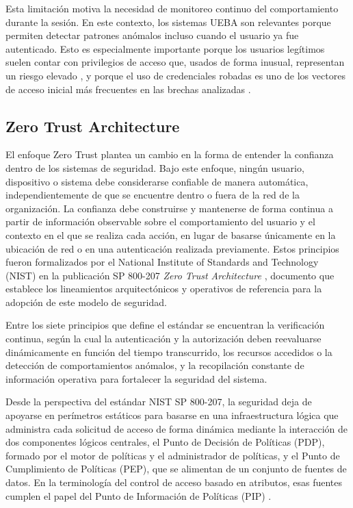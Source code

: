 Esta limitación motiva la necesidad de monitoreo continuo del comportamiento durante la sesión. En este contexto, los sistemas UEBA son relevantes porque permiten detectar patrones anómalos incluso cuando el usuario ya fue autenticado. Esto es especialmente importante porque los usuarios legítimos suelen contar con privilegios de acceso que, usados de forma inusual, representan un riesgo elevado \parencite{Artioli2024}, y porque el uso de credenciales robadas es uno de los vectores de acceso inicial más frecuentes en las brechas analizadas \parencite{Verizon2025}.

\subsection{Zero Trust Architecture}\label{sec:zero-trust}
El enfoque Zero Trust plantea un cambio en la forma de entender la confianza dentro de los sistemas de seguridad. Bajo este enfoque, ningún usuario, dispositivo o sistema debe considerarse confiable de manera automática, independientemente de que se encuentre dentro o fuera de la red de la organización. La confianza debe construirse y mantenerse de forma continua a partir de información observable sobre el comportamiento del usuario y el contexto en el que se realiza cada acción, en lugar de basarse únicamente en la ubicación de red o en una autenticación realizada previamente. Estos principios fueron formalizados por el National Institute of Standards and Technology (NIST) en la publicación SP 800-207 \emph{Zero Trust Architecture} \parencite{Rose2020}, documento que establece los lineamientos arquitectónicos y operativos de referencia para la adopción de este modelo de seguridad.

Entre los siete principios que define el estándar se encuentran la verificación continua, según la cual la autenticación y la autorización deben reevaluarse dinámicamente en función del tiempo transcurrido, los recursos accedidos o la detección de comportamientos anómalos, y la recopilación constante de información operativa para fortalecer la seguridad del sistema.

Desde la perspectiva del estándar NIST SP 800-207, la seguridad deja de apoyarse en perímetros estáticos para basarse en una infraestructura lógica que administra cada solicitud de acceso de forma dinámica mediante la interacción de dos componentes lógicos centrales, el Punto de Decisión de Políticas (PDP), formado por el motor de políticas y el administrador de políticas, y el Punto de Cumplimiento de Políticas (PEP), que se alimentan de un conjunto de fuentes de datos. En la terminología del control de acceso basado en atributos, esas fuentes cumplen el papel del Punto de Información de Políticas (PIP) \parencite{Hu2014}.

